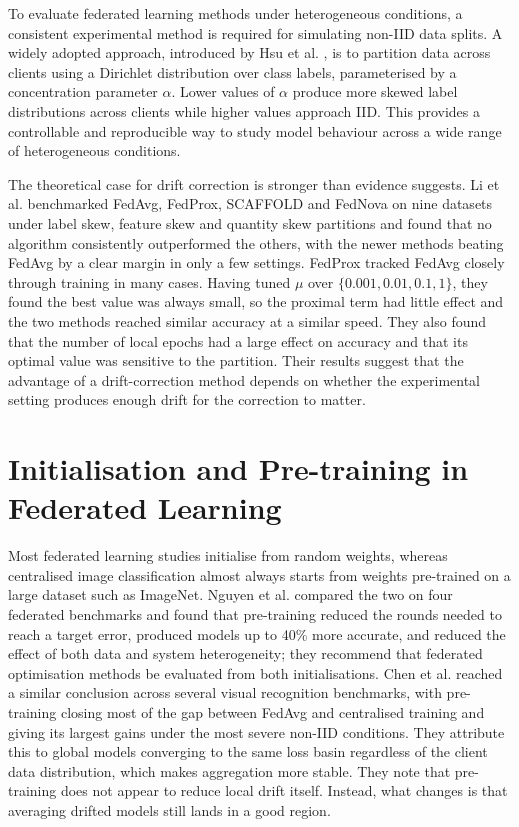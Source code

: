 \documentclass[12pt,openany,a4paper]{book}
\begin{document}
To evaluate federated learning methods under heterogeneous conditions, a consistent experimental method is required for simulating non-IID data splits. A widely adopted approach, introduced by Hsu et al. \cite{hsuMeasuringEffectsNonIdentical2019}, is to partition data across clients using a Dirichlet distribution over class labels, parameterised by a concentration parameter $\alpha$. Lower values of $\alpha$ produce more skewed label distributions across clients while higher values approach IID. This provides a controllable and reproducible way to study model behaviour across a wide range of heterogeneous conditions.

The theoretical case for drift correction is stronger than evidence suggests. Li et al. \cite{liFederatedLearningNonIID2021} benchmarked FedAvg, FedProx, SCAFFOLD and FedNova on nine datasets under label skew, feature skew and quantity skew partitions and found that no algorithm consistently outperformed the others, with the newer methods beating FedAvg by a clear margin in only a few settings. FedProx tracked FedAvg closely through training in many cases. Having tuned $\mu$ over $\{0.001, 0.01, 0.1, 1\}$, they found the best value was always small, so the proximal term had little effect and the two methods reached similar accuracy at a similar speed. They also found that the number of local epochs had a large effect on accuracy and that its optimal value was sensitive to the partition. Their results suggest that the advantage of a drift-correction method depends on whether the experimental setting produces enough drift for the correction to matter.

\section{Initialisation and Pre-training in Federated Learning}

Most federated learning studies initialise from random weights, whereas centralised image classification almost always starts from weights pre-trained on a large dataset such as ImageNet. Nguyen et al. \cite{nguyenWhereBeginImpact2022} compared the two on four federated benchmarks and found that pre-training reduced the rounds needed to reach a target error, produced models up to 40\% more accurate, and reduced the effect of both data and system heterogeneity; they recommend that federated optimisation methods be evaluated from both initialisations. Chen et al. \cite{chenImportanceApplicabilityPreTraining2023} reached a similar conclusion across several visual recognition benchmarks, with pre-training closing most of the gap between FedAvg and centralised training and giving its largest gains under the most severe non-IID conditions. They attribute this to global models converging to the same loss basin regardless of the client data distribution, which makes aggregation more stable. They note that pre-training does not appear to reduce local drift itself. Instead, what changes is that averaging drifted models still lands in a good region.
\end{document}
